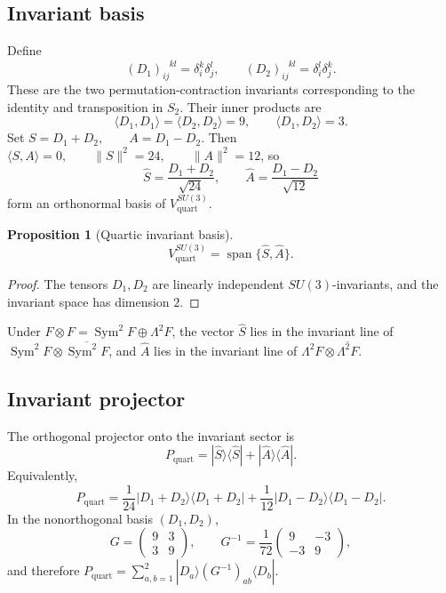 \documentclass[11pt]{article}
\theoremstyle{plain}
\newtheorem{proposition}[theorem]{Proposition}
\theoremstyle{definition}
\begin{document}
\subsection{Invariant basis}

Define
\[
(D_1)_{ij}^{\phantom{ij}kl}
=
\delta_i^k\delta_j^l,
\qquad
(D_2)_{ij}^{\phantom{ij}kl}
=
\delta_i^l\delta_j^k.
\]
These are the two permutation-contraction invariants corresponding to the identity and transposition in \(S_2\). Their inner products are
\[
\langle D_1,D_1\rangle
=
\langle D_2,D_2\rangle
=
9,
\qquad
\langle D_1,D_2\rangle=3.
\]
Set
\(S=D_1+D_2, \qquad A=D_1-D_2\).
Then
\(\langle S,A\rangle=0, \qquad \|S\|^2=24, \qquad \|A\|^2=12\),
so
\[
\widehat S=\frac{D_1+D_2}{\sqrt{24}},
\qquad
\widehat A=\frac{D_1-D_2}{\sqrt{12}}
\]
form an orthonormal basis of \(V_{\mathrm{quart}}^{SU(3)}\).

\begin{proposition}[Quartic invariant basis]
\label{prop:quartic-invariant-basis}
\[
V_{\mathrm{quart}}^{SU(3)}
=
\operatorname{span}\{\widehat S,\widehat A\}.
\]
\end{proposition}

\begin{proof}
The tensors \(D_1,D_2\) are linearly independent \(SU(3)\)-invariants, and the invariant space has dimension \(2\).
\end{proof}

Under
\(F\otimes F = \operatorname{Sym}^2F\oplus\Lambda^2F\),
the vector \(\widehat S\) lies in the invariant line of
\(\operatorname{Sym}^2F\otimes\overline{\operatorname{Sym}^2F}\),
and \(\widehat A\) lies in the invariant line of
\(\Lambda^2F\otimes\overline{\Lambda^2F}\).

\subsection{Invariant projector}

The orthogonal projector onto the invariant sector is
\begin{equation}
\label{eq:quartic-projector}
P_{\mathrm{quart}}
=
|\widehat S\rangle\langle\widehat S|
+
|\widehat A\rangle\langle\widehat A|.
\end{equation}
Equivalently,
\[
P_{\mathrm{quart}}
=
\frac{1}{24}
|D_1+D_2\rangle\langle D_1+D_2|
+
\frac{1}{12}
|D_1-D_2\rangle\langle D_1-D_2|.
\]
In the nonorthogonal basis \((D_1,D_2)\),
\[
G
=
\begin{pmatrix}
9&3\\
3&9
\end{pmatrix},
\qquad
G^{-1}
=
\frac1{72}
\begin{pmatrix}
9&-3\\
-3&9
\end{pmatrix},
\]
and therefore
\(P_{\mathrm{quart}} = \sum_{a,b=1}^{2} |D_a\rangle(G^{-1})_{ab}\langle D_b|\).
\end{document}
